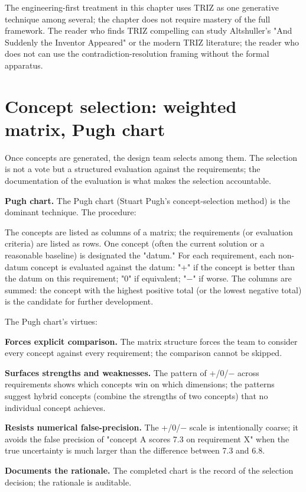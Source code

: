 The engineering-first treatment in this chapter uses TRIZ as one generative technique among several; the chapter does not require mastery of the full framework. The reader who finds TRIZ compelling can study Altshuller's "And Suddenly the Inventor Appeared" or the modern TRIZ literature; the reader who does not can use the contradiction-resolution framing without the formal apparatus.

\section{Concept selection: weighted matrix, Pugh chart}

Once concepts are generated, the design team selects among them. The selection is not a vote but a structured evaluation against the requirements; the documentation of the evaluation is what makes the selection accountable.

\textbf{Pugh chart.} The Pugh chart (Stuart Pugh's concept-selection method) is the dominant technique. The procedure:

The concepts are listed as columns of a matrix; the requirements (or evaluation criteria) are listed as rows. One concept (often the current solution or a reasonable baseline) is designated the "datum." For each requirement, each non-datum concept is evaluated against the datum: "+" if the concept is better than the datum on this requirement; "0" if equivalent; "$-$" if worse. The columns are summed: the concept with the highest positive total (or the lowest negative total) is the candidate for further development.

The Pugh chart's virtues:

\textbf{Forces explicit comparison.} The matrix structure forces the team to consider every concept against every requirement; the comparison cannot be skipped.

\textbf{Surfaces strengths and weaknesses.} The pattern of +/0/$-$ across requirements shows which concepts win on which dimensions; the patterns suggest hybrid concepts (combine the strengths of two concepts) that no individual concept achieves.

\textbf{Resists numerical false-precision.} The +/0/$-$ scale is intentionally coarse; it avoids the false precision of "concept A scores 7.3 on requirement X" when the true uncertainty is much larger than the difference between 7.3 and 6.8.

\textbf{Documents the rationale.} The completed chart is the record of the selection decision; the rationale is auditable.

